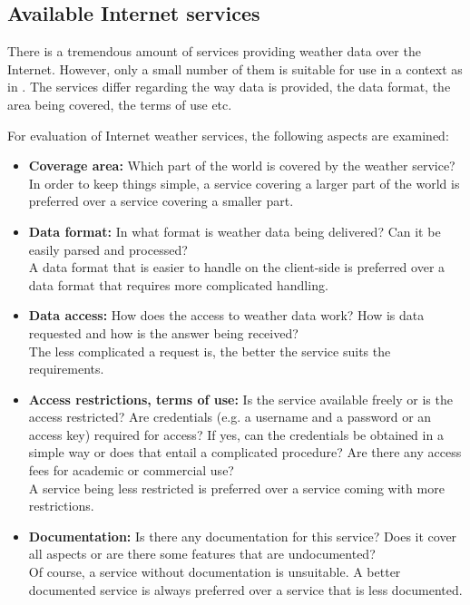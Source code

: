 \subsection{Available Internet services}

There is a tremendous amount of services providing weather data over the Internet. However, only a small number of them is suitable for use in a context as in \thinkhome. The services differ regarding the way data is provided, the data format, the area being covered, the terms of use etc.

For evaluation of Internet weather services, the following aspects are examined:

\begin{itemize}
  \item \textbf{Coverage area:} Which part of the world is covered by the weather service?\\
  In order to keep things simple, a service covering a larger part of the world is preferred over a service covering a smaller part.
  \item \textbf{Data format:} In what format is weather data being delivered? Can it be easily parsed and processed?\\
  A data format that is easier to handle on the client-side is preferred over a data format that requires more complicated handling.
  \item \textbf{Data access:} How does the access to weather data work? How is data requested and how is the answer being received?\\
  The less complicated a request is, the better the service suits the requirements.
  \item \textbf{Access restrictions, terms of use:} Is the service available freely or is the access restricted? Are credentials (e.g. a username and a password or an access key) required for access? If yes, can the credentials be obtained in a simple way or does that entail a complicated procedure? Are there any access fees for academic or commercial use?\\
  A service being less restricted is preferred over a service coming with more restrictions.
  \item \textbf{Documentation:} Is there any documentation for this service? Does it cover all aspects or are there some features that are undocumented?\\
  Of course, a service without documentation is unsuitable. A better documented service is always preferred over a service that is less documented.

\end{itemize}
